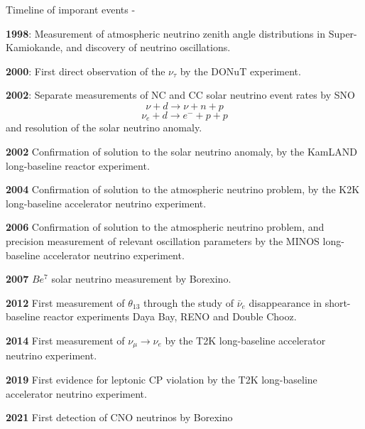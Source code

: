 \begin{frame}[t,allowframebreaks]{Timeline of imporant events - }
\begin{itemize}
{  \item {\bf 1998}: Measurement of atmospheric neutrino zenith angle distributions
  in Super-Kamiokande, and discovery of neutrino oscillations.

  \item {\bf 2000}: First direct observation of the $\nu_{\tau}$ by the DONuT experiment.

  \item {\bf 2002}: Separate measurements of NC and CC solar neutrino event rates
   by SNO
   \begin{equation*}
     \nu + d \rightarrow \nu + n + p
   \end{equation*}
   \begin{equation*}
     \nu_{e} + d \rightarrow e^- + p + p
   \end{equation*}
   and resolution of the solar neutrino anomaly.

  \item {\bf 2002} Confirmation of solution to the solar neutrino anomaly,
  by the KamLAND long-baseline reactor experiment.

  \item {\bf 2004} Confirmation of solution to the atmospheric neutrino problem,
  by the K2K long-baseline accelerator neutrino experiment.

  \item {\bf 2006} Confirmation of solution to the atmospheric neutrino problem,
  and precision measurement of relevant oscillation parameters
  by the MINOS long-baseline accelerator neutrino experiment.

  \item {\bf 2007} $Be^7$ solar neutrino measurement by Borexino.

  \item {\bf 2012} First measurement of $\theta_{13}$ through the study of $\bar{\nu}_e$
  disappearance in short-baseline reactor experiments Daya Bay, RENO and Double Chooz.

  \item {\bf 2014} First measurement of $\nu_{\mu} \rightarrow \nu_{e}$ by
  the T2K long-baseline accelerator neutrino experiment.

  \item {\bf 2019} First evidence for leptonic CP violation by
  the T2K long-baseline accelerator neutrino experiment.

  \item {\bf 2021} First detection of CNO neutrinos by Borexino

}
\end{itemize}

\end{frame}

